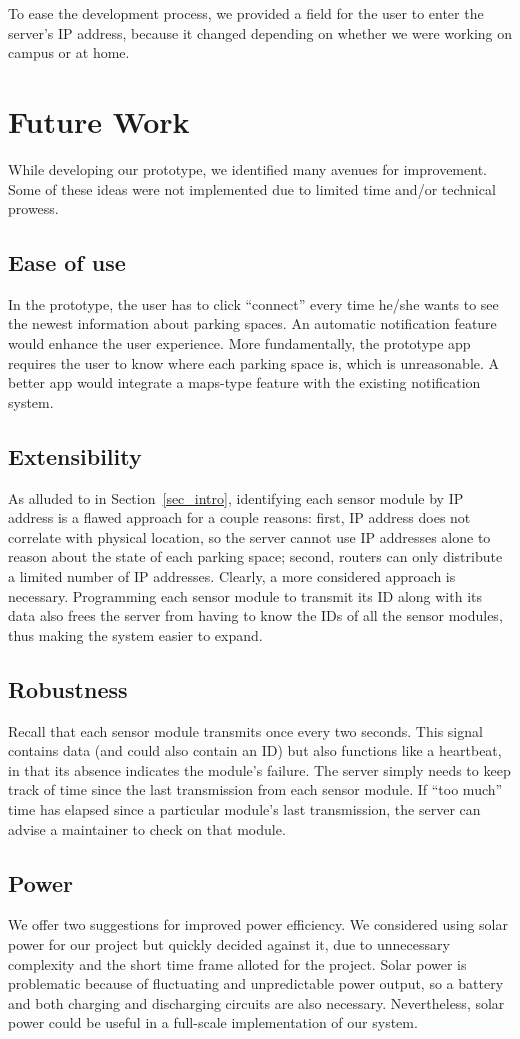 \documentclass[conference]{IEEEtran}
\begin{document}
To ease the development process, we provided a field for the user to enter the server's IP address, because it changed depending on whether we were working on campus or at home.

\section{Future Work}\label{sec_futurework}
While developing our prototype, we identified many avenues for improvement. Some of these ideas were not implemented due to limited time and/or technical prowess.
\subsection{Ease of use}
In the prototype, the user has to click ``connect'' every time he/she wants to see the newest information about parking spaces. An automatic notification feature would enhance the user experience. More fundamentally, the prototype app requires the user to know where each parking space is, which is unreasonable. A better app would integrate a maps-type feature with the existing notification system.
\subsection{Extensibility}
As alluded to in Section~\ref{sec_intro}, identifying each sensor module by IP address is a flawed approach for a couple reasons: first, IP address does not correlate with physical location, so the server cannot use IP addresses alone to reason about the state of each parking space; second, routers can only distribute a limited number of IP addresses. Clearly, a more considered approach is necessary. Programming each sensor module to transmit its ID along with its data also frees the server from having to know the IDs of all the sensor modules, thus making the system easier to expand.
\subsection{Robustness}
Recall that each sensor module transmits once every two seconds. This signal contains data (and could also contain an ID) but also functions like a heartbeat, in that its absence indicates the module's failure. The server simply needs to keep track of time since the last transmission from each sensor module. If ``too much'' time has elapsed since a particular module's last transmission, the server can advise a maintainer to check on that module.
\subsection{Power}
We offer two suggestions for improved power efficiency. We considered using solar power for our project but quickly decided against it, due to unnecessary complexity and the short time frame alloted for the project. Solar power is problematic because of fluctuating and unpredictable power output, so a battery and both charging and discharging circuits are also necessary. Nevertheless, solar power could be useful in a full-scale implementation of our system.
\end{document}
